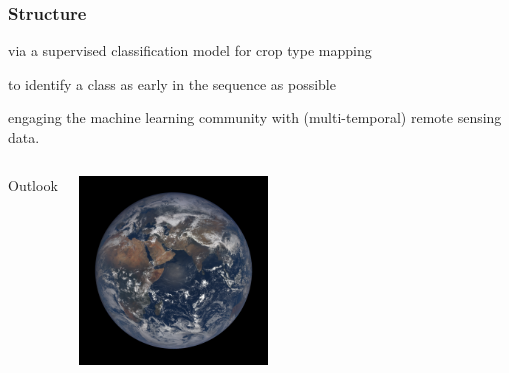 \documentclass[%
  aspectratio=169,
  9pt,
  USenglish,
  titlegraphic, %
  affiliationintitlepagehead,
  progressbar,
]{beamer}
\begin{document}
\begin{frame}
\frametitle{Structure}

\Large

\begin{description}[itemsep=1em]
	\item<1->[\color{tumblue}Vegetation Monitoring] via a supervised classification model for crop type mapping
	\item<2->[\color{tumblue}Early Time Series Classification] to identify a class as early in the sequence as possible
	\item<3->[\color{tumblue}Compiling Datasets] engaging the machine learning community with (multi-temporal) remote sensing data.
\end{description}
\end{frame}















{
	\begin{frame}[plain]
	
	\vfill
	\Huge\color{white}
	\begin{center}
		\begin{columns}
			\vspace{7em}
			
			\hfill 
			Outlook
			
			\includegraphics[width=5cm]{images/epic1}
		\end{columns}
	\end{center}
	
	\vfill
\end{frame}
}
\end{document}
